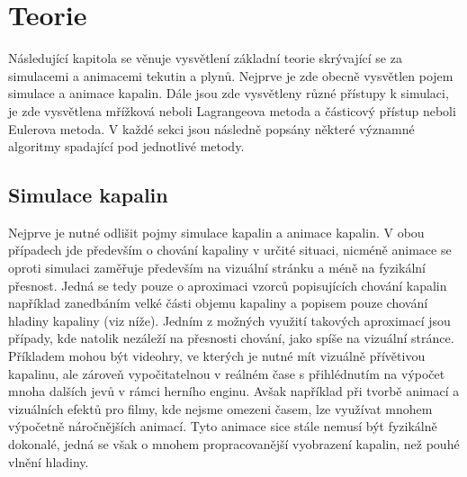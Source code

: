 \chapter{Teorie}
Následující kapitola se věnuje vysvětlení základní teorie skrývající se za simulacemi a animacemi tekutin a plynů. Nejprve je zde obecně vysvětlen pojem simulace a animace kapalin. Dále jsou zde vysvětleny různé přístupy k simulaci, je zde vysvětlena mřížková neboli Lagrangeova metoda a částicový přístup neboli Eulerova metoda. V každé sekci jsou následně popsány některé významné algoritmy spadající pod jednotlivé metody.

\label{chapter:teorie}
\section{Simulace kapalin}
Nejprve je nutné odlišit pojmy simulace kapalin a animace kapalin. V obou případech jde především o chování kapaliny v určité situaci, nicméně animace se oproti simulaci zaměřuje především na vizuální stránku a méně na fyzikální přesnost. Jedná se tedy pouze o aproximaci vzorců popisujících chování kapalin například zanedbáním velké části objemu kapaliny a popisem pouze chování hladiny kapaliny (viz níže). Jedním z možných využití takových aproximací jsou případy, kde natolik nezáleží na přesnosti chování, jako spíše na vizuální stránce. Příkladem mohou být videohry, ve kterých je nutné mít vizuálně přívětivou kapalinu, ale zároveň vypočitatelnou v reálném čase s přihlédnutím na výpočet mnoha dalších jevů v rámci herního enginu. Avšak například při tvorbě animací a vizuálních efektů pro filmy, kde nejsme omezeni časem, lze využívat mnohem výpočetně náročnějších animací. Tyto animace sice stále nemusí být fyzikálně dokonalé, jedná se však o mnohem propracovanější vyobrazení kapalin, než pouhé vlnění hladiny. \cite{Medvecky-Heretik2018thesis}

